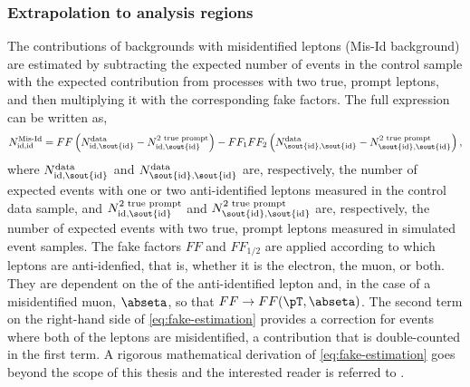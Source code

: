\subsubsection{Extrapolation to analysis regions}
The contributions of backgrounds with misidentified leptons (Mis-Id background) are estimated by subtracting the  expected number of events in the control sample with the expected contribution from processes with two true, prompt leptons, and then multiplying it with the corresponding fake factors.
The full expression can be written as,
\begin{equation}
    \label{eq:fake-estimation}
    N_{\text{id,id}}^{\text{Mis-Id}} = FF \left( N_{\text{id,\sout{id}}}^{\text{data}} - N_{\text{id,\sout{id}}}^{\text{2 true prompt}} \right) - FF_1FF_2 \left( N_{\text{\sout{id},\sout{id}}}^{\text{data}} - N_{\text{\sout{id},\sout{id}}}^{\text{2 true prompt}} \right),
\end{equation}
where $N_{\text{id,\sout{id}}}^{\text{data}}$ and $N_{\text{\sout{id},\sout{id}}}^{\text{data}}$ are, respectively, the number of expected events with one or two anti-identified leptons measured in the control data sample, and $N_{\text{id,\sout{id}}}^{\text{2 true prompt}}$ and $N_{\text{\sout{id},\sout{id}}}^{\text{2 true prompt}}$ are, respectively, the number of expected events with two true, prompt leptons measured in simulated event samples. 
The fake factors $FF$ and $FF_{1/2}$ are applied according to which leptons are anti-idenfied, that is, whether it is the electron, the muon, or both. 
They are dependent on the \pT of the anti-identified lepton and, in the case of a misidentified muon, $\abseta$, so that $FF \to FF(\pT, \abseta)$.
The second term on the right-hand side of \cref{eq:fake-estimation} provides a correction for events where both of the leptons are misidentified, a contribution that is double-counted in the first term. A rigorous mathematical derivation of \cref{eq:fake-estimation} goes beyond the scope of this thesis and the interested reader is referred to .

